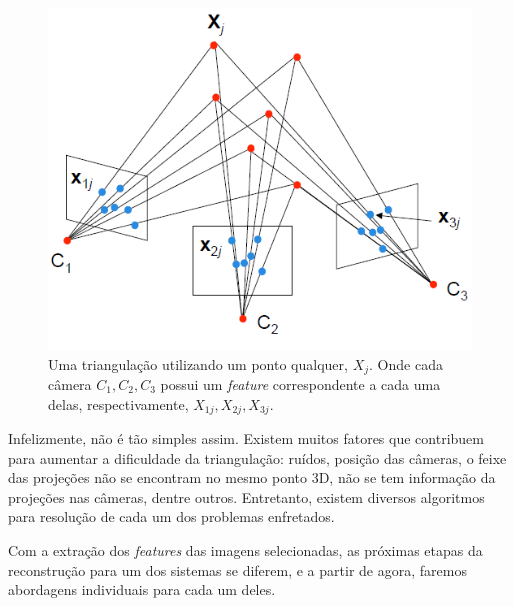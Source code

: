 \begin{figure} [!h]
	\centering
	\includegraphics[width=0.45\linewidth]{figs/triangulacao.png}
	\caption{%
	Uma triangulação utilizando um ponto qualquer, $X_j$. Onde cada câmera $C_1, C_2, C_3$ possui um \emph{feature} correspondente a cada uma delas, respectivamente, $X_{1j}, X_{2j}, X_{3j}$.
	}\label{fig:triangulacao}
\end{figure}


Infelizmente, não é tão simples assim. Existem muitos fatores que contribuem para aumentar a dificuldade da triangulação: ruídos, posição das câmeras, o feixe das projeções não se encontram no mesmo ponto 3D, não se tem informação da projeções nas câmeras, dentre outros. Entretanto, existem diversos algoritmos para resolução de cada um dos problemas enfretados. 

Com a extração dos \emph{features} das imagens selecionadas, as próximas etapas da reconstrução para um dos sistemas se diferem, e a partir de agora, faremos abordagens individuais para cada um deles.




